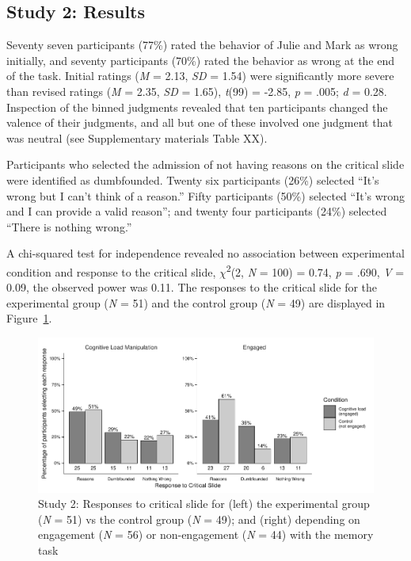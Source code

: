 \documentclass[
  american,
  man,floatsintext]{apa7}
\begin{document}
\hypertarget{study-2-results}{%
\subsection{Study 2: Results}\label{study-2-results}}

Seventy seven participants (77\%) rated the behavior of Julie and Mark as wrong initially, and seventy participants (70\%) rated the behavior as wrong at the end of the task. Initial ratings (\emph{M} = 2.13, \emph{SD} = 1.54) were significantly more severe than revised ratings (\emph{M} = 2.35, \emph{SD} = 1.65), \emph{t}(99) = -2.85, \emph{p} = .005; \emph{d} = 0.28. Inspection of the binned judgments revealed that ten participants changed the valence of their judgments, and all but one of these involved one judgment that was neutral (see Supplementary materials Table XX).

Participants who selected the admission of not having reasons on the critical slide were identified as dumbfounded. Twenty six participants (26\%) selected ``It's wrong but I can't think of a reason.'' Fifty participants (50\%) selected ``It's wrong and I can provide a valid reason''; and twenty four participants (24\%) selected ``There is nothing wrong.''

A chi-squared test for independence revealed no association between experimental condition and response to the critical slide, \(\chi\)\textsuperscript{2}(2, \emph{N} = 100) = 0.74, \emph{p} = .690, \emph{V} = 0.09, the observed power was 0.11. The responses to the critical slide for the experimental group (\emph{N} = 51) and the control group (\emph{N} = 49) are displayed in Figure~\ref{fig:S2figboth}.

\begin{figure}
\centering
\includegraphics{Study_2_files/figure-latex/S2figboth-1.pdf}
\caption{\label{fig:S2figboth}Study 2: Responses to critical slide for (left) the experimental group (\emph{N} = 51) vs the control group (\emph{N} = 49); and (right) depending on engagement (\emph{N} = 56) or non-engagement (\emph{N} = 44) with the memory task}
\end{figure}
\end{document}
